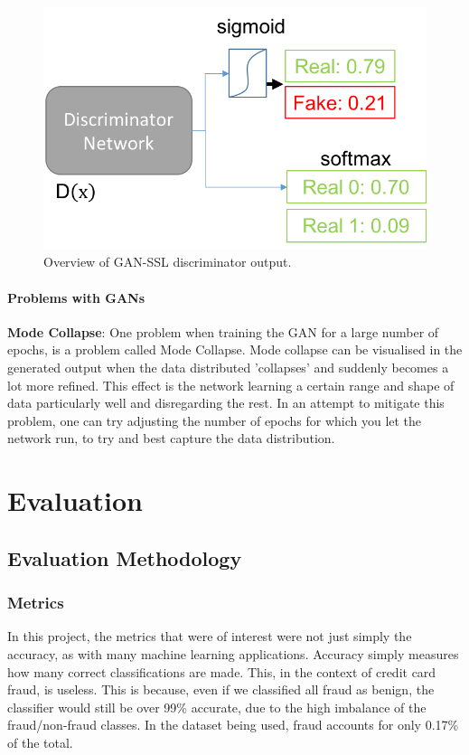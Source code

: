 \documentclass[12pt,a4paper,twoside]{report}
\begin{document}
\begin{figure}[H]
\centering
\includegraphics[scale=0.8]{gan-ssl}
\caption{Overview of GAN-SSL discriminator output.}
\label{fig:gan-ssl}
\end{figure}

\subsubsection{Problems with GANs}

\textbf{Mode Collapse}: One problem when training the GAN for a large number of epochs, is a problem called Mode Collapse. Mode collapse can be visualised in the generated output when the data distributed 'collapses' and suddenly becomes a lot more refined. This effect is the network learning a certain range and shape of data particularly well and disregarding the rest. In an attempt to mitigate this problem, one can try adjusting the number of epochs for which you let the network run, to try and best capture the data distribution. 


\chapter{Evaluation}
\section{Evaluation Methodology}
\subsection{Metrics}
In this project, the metrics that were of interest were not just simply the accuracy, as with many machine learning applications. Accuracy simply measures how many correct classifications are made. This, in the context of credit card fraud, is useless. This is because, even if we classified all fraud as benign, the classifier would still be over 99\% accurate, due to the high imbalance of the fraud/non-fraud classes. In the dataset being used, fraud accounts for only 0.17\% of the total. 
\end{document}
